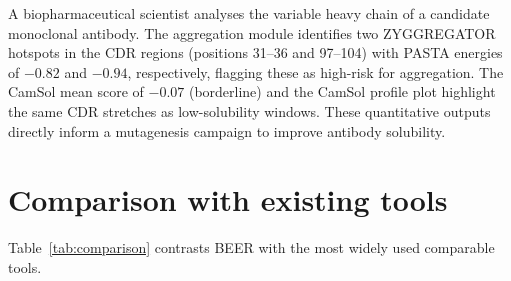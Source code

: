 \documentclass[12pt]{article}
\begin{document}
A biopharmaceutical scientist analyses the variable heavy chain of a candidate
monoclonal antibody.
The aggregation module identifies two ZYGGREGATOR hotspots in the CDR regions
(positions 31--36 and 97--104) with PASTA energies of $-0.82$ and $-0.94$,
respectively, flagging these as high-risk for aggregation.
The CamSol mean score of $-0.07$ (borderline) and the CamSol profile plot
highlight the same CDR stretches as low-solubility windows.
These quantitative outputs directly inform a mutagenesis campaign to improve
antibody solubility.

\section{Comparison with existing tools}
\label{sec:comparison}

Table~\ref{tab:comparison} contrasts BEER with the most widely used
comparable tools.
\end{document}
